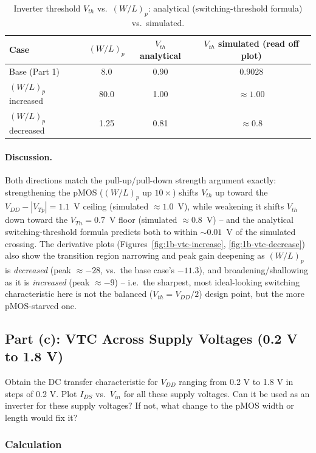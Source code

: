 \begin{table}[h]
  \centering
  \begin{tabular}{|l|c|c|c|}
    \hline
    Case & $(W/L)_p$ & $V_{th}$ analytical & $V_{th}$ simulated (read off plot) \\
    \hline
    Base (Part 1)        & 8.0  & 0.90 & 0.9028 \\
    $(W/L)_p$ increased  & 80.0 & 1.00 & $\approx1.00$ \\
    $(W/L)_p$ decreased  & 1.25 & 0.81 & $\approx0.8$ \\
    \hline
  \end{tabular}
  \caption{Inverter threshold $V_{th}$ vs.\ $(W/L)_p$: analytical
  (switching-threshold formula) vs.\ simulated.}
  \label{tab:1b-vth}
\end{table}

\paragraph{Discussion.} Both directions match the pull-up/pull-down strength
argument exactly: strengthening the pMOS ($(W/L)_p$ up $10\times$) shifts
$V_{th}$ up toward the $V_{DD}-|V_{Tp}|=1.1$~V ceiling (simulated
$\approx1.0$~V), while weakening it shifts $V_{th}$ down toward the
$V_{Tn}=0.7$~V floor (simulated $\approx0.8$~V) -- and the analytical
switching-threshold formula predicts both to within $\sim0.01$~V of the
simulated crossing. The derivative plots (Figures~\ref{fig:1b-vtc-increase},
\ref{fig:1b-vtc-decrease}) also show the transition region narrowing and peak
gain deepening as $(W/L)_p$ is \emph{decreased} (peak $\approx-28$, vs.\ the base
case's $-11.3$), and broadening/shallowing as it is \emph{increased} (peak
$\approx-9$) -- i.e.\ the sharpest, most ideal-looking switching characteristic
here is not the balanced ($V_{th}=V_{DD}/2$) design point, but the more
pMOS-starved one.

\subsection{Part (c): VTC Across Supply Voltages (0.2 V to 1.8 V)}

Obtain the DC transfer characteristic for $V_{DD}$ ranging from 0.2 V to 1.8 V
in steps of 0.2 V. Plot $I_{DS}$ vs.\ $V_{in}$ for all these supply voltages. Can
it be used as an inverter for these supply voltages? If not, what change to the
pMOS width or length would fix it?

\subsubsection{Calculation}

